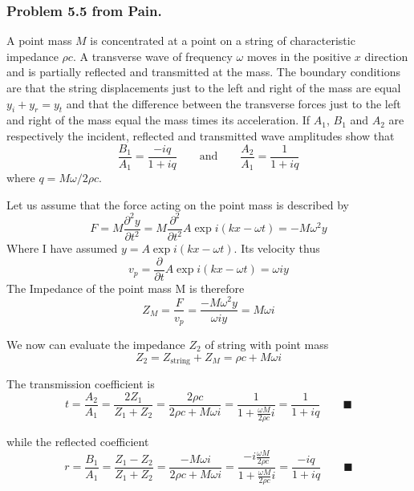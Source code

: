 \documentclass[../../../main.tex]{subfiles}
\begin{document}
\subsubsection*{Problem 5.5 from Pain.} A point mass $M$ is concentrated at a point on a string of characteristic impedance $\rho c$. A transverse wave of frequency $\omega$ moves in the positive $x$ direction and is partially reflected and transmitted at the mass. The boundary conditions are that the string displacements just to the left and right of the mass are equal $y_i+y_r=y_t$ and that the difference between the transverse forces just to the left and right of the mass equal the mass times its acceleration. If $A_1$, $B_1$ and $A_2$ are respectively the incident, reflected and transmitted wave amplitudes show that
\begin{equation*}
    \frac{B_1}{A_1}=\frac{-iq}{1+iq}\qquad \text{and}\qquad \frac{A_2}{A_1}=\frac{1}{1+iq}
\end{equation*}
where $q=M\omega/ 2\rho c$. 

Let us assume that the force acting on the point mass is described by
\begin{equation*}
    F=M\frac{\partial^2 y}{\partial t^2}=M \frac{\partial^2 }{\partial t^2} A\exp i(kx-\omega t)=-M\omega^2 y
\end{equation*}
Where I have assumed $y=A \exp i(kx-\omega t)$. Its velocity thus
\begin{equation*}
    v_p=\frac{\partial }{\partial t} A\exp i(kx-\omega t)=\omega i y
\end{equation*}
The Impedance of the point mass M is therefore
\begin{equation*}
    Z_M=\frac{F}{v_p}=\frac{-M\omega^2 y}{\omega i y}=M\omega i
\end{equation*}

We now can evaluate the impedance $Z_2$ of string with point mass
\begin{equation*}
    Z_2=Z_{\text{string}}+Z_M=\rho c+M\omega i
\end{equation*}

The transmission coefficient is
\begin{equation*}
    t=\frac{A_2}{A_1}=\frac{2Z_1}{Z_1+Z_2}=\frac{2\rho c}{2\rho c+M\omega i}=\frac{1}{1+\frac{\omega M}{2\rho c}i}=\frac{1}{1+iq}\qquad \blacksquare
\end{equation*}

while the reflected coefficient
\begin{equation*}
    r=\frac{B_1}{A_1}=\frac{Z_1-Z_2}{Z_1+Z_2}=\frac{-M\omega i}{2\rho c+M\omega i}=\frac{-i\frac{\omega M}{2\rho c}}{1+\frac{\omega M}{2\rho c}i}=\frac{-iq}{1+iq}\qquad \blacksquare
\end{equation*}
\end{document}
